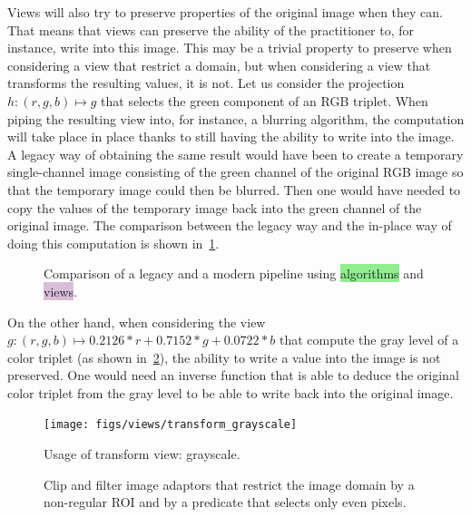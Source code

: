 Views will also try to preserve properties of the original image when they can. That means that views can preserve the
ability of the practitioner to, for instance, write into this image. This may be a trivial property to preserve when
considering a view that restrict a domain, but when considering a view that transforms the resulting values, it is not.
Let us consider the projection $h: (r,g,b) \mapsto g$ that selects the green component of an RGB triplet. When piping
the resulting view into, for instance, a blurring algorithm, the computation will take place in place thanks to still
having the ability to write into the image. A legacy way of obtaining the same result would have been to create a
temporary single-channel image consisting of the green channel of the original RGB image so that the temporary image
could then be blurred. Then one would have needed to copy the values of the temporary image back into the green channel
of the original image. The comparison between the legacy way and the in-place way of doing this computation is shown
in~\cref{fig.legacy.vs.view}.

\begin{figure}[tbh]
  \centering
  \hfil

  \caption{Comparison of a legacy and a modern pipeline using \colorbox{lightgreen}{algorithms} and
    \colorbox{thistle}{views}.}
  \label{fig.legacy.vs.view}
\end{figure}

On the other hand, when considering the view $g: (r,g,b) \mapsto 0.2126*r+0.7152*g+0.0722*b$ that compute the gray level
of a color triplet (as shown in~\cref{fig.view.grayscale}), the ability to write a value into the image is not
preserved. One would need an inverse function that is able to deduce the original color triplet from the gray level to
be able to write back into the original image.

\begin{figure}[tbh]
  \centering
  \texttt{[image: figs/views/transform\_grayscale]}
  \caption{Usage of transform view: grayscale.}
  \label{fig.view.grayscale}
\end{figure}

\begin{figure}[tbh]
  

  
  \caption{Clip and filter image adaptors that restrict the image domain by a non-regular ROI and by a predicate that
    selects only even pixels.}
  \label{fig.view.clip}
\end{figure}

